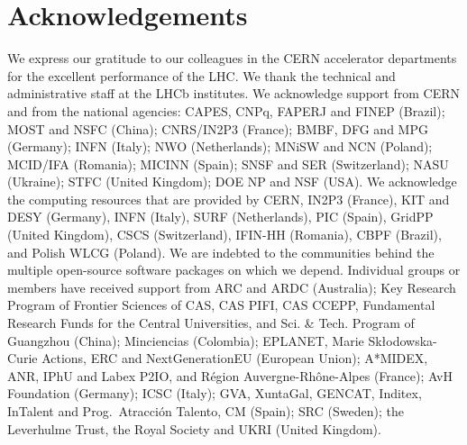 \section*{Acknowledgements}
%
%
\noindent We express our gratitude to our colleagues in the CERN
accelerator departments for the excellent performance of the LHC. We
thank the technical and administrative staff at the LHCb
institutes.
We acknowledge support from CERN and from the national agencies:
CAPES, CNPq, FAPERJ and FINEP (Brazil); 
MOST and NSFC (China); 
CNRS/IN2P3 (France); 
BMBF, DFG and MPG (Germany); 
INFN (Italy); 
NWO (Netherlands); 
MNiSW and NCN (Poland); 
MCID/IFA (Romania); 
MICINN (Spain); 
SNSF and SER (Switzerland); 
NASU (Ukraine); 
STFC (United Kingdom); 
DOE NP and NSF (USA).
We acknowledge the computing resources that are provided by CERN, IN2P3
(France), KIT and DESY (Germany), INFN (Italy), SURF (Netherlands),
PIC (Spain), GridPP (United Kingdom), 
CSCS (Switzerland), IFIN-HH (Romania), CBPF (Brazil),
and Polish WLCG (Poland).
We are indebted to the communities behind the multiple open-source
software packages on which we depend.
Individual groups or members have received support from
ARC and ARDC (Australia);
Key Research Program of Frontier Sciences of CAS, CAS PIFI, CAS CCEPP, 
Fundamental Research Funds for the Central Universities, 
and Sci. \& Tech. Program of Guangzhou (China);
Minciencias (Colombia);
EPLANET, Marie Sk\l{}odowska-Curie Actions, ERC and NextGenerationEU (European Union);
A*MIDEX, ANR, IPhU and Labex P2IO, and R\'{e}gion Auvergne-Rh\^{o}ne-Alpes (France);
AvH Foundation (Germany);
ICSC (Italy); 
GVA, XuntaGal, GENCAT, Inditex, InTalent and Prog.~Atracci\'on Talento, CM (Spain);
SRC (Sweden);
the Leverhulme Trust, the Royal Society
 and UKRI (United Kingdom).

